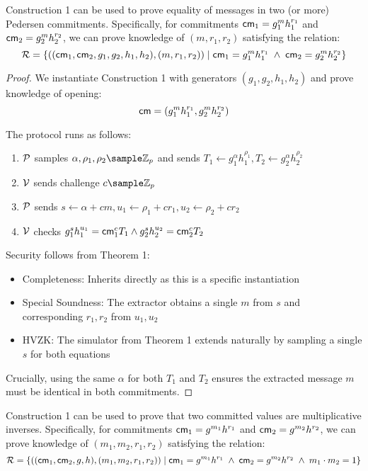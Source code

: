 {\begin{corollary}
    Construction 1 can be used to prove equality of messages in two (or more) Pedersen commitments. Specifically, for commitments $\mathsf{cm}_1 = g_1^m h_1^{r_1}$ and $\mathsf{cm}_2 = g_2^m h_2^{r_2}$, we can prove knowledge of $(m, r_1, r_2)$ satisfying the relation:
    \[
    \mathcal{R} = \left\{ ((\mathsf{cm}_1, \mathsf{cm}_2, g_1, g_2, h_1, h_2), (m,r_1,r_2)) \; | \; \mathsf{cm}_1 = g_1^{m}h_1^{r_1} \; \wedge \; \mathsf{cm}_2 = g_2^{m}h_2^{r_2} \right\}
    \]    
\end{corollary}

\begin{proof}
    We instantiate Construction 1 with generators $(g_1, g_2, h_1, h_2)$ and prove knowledge of opening:
    \[
    \mathsf{cm} = (g_1^m h_1^{r_1}, g_2^m h_2^{r_2})
    \]
    
\noindent    The protocol runs as follows:
    \begin{enumerate}
        \item $\mathcal{P}$ samples $\alpha, \rho_1, \rho_2 \sample \Z_p$ and sends $T_1 \gets g_1^{\alpha}h_1^{\rho_1}, T_2 \gets g_2^{\alpha}h_2^{\rho_2}$
        \item $\mathcal{V}$ sends challenge $c \sample \Z_p$
        \item $\mathcal{P}$ sends $s \gets \alpha + cm, u_1 \gets \rho_1 + cr_1, u_2 \gets \rho_2 + cr_2$
        \item $\mathcal{V}$ checks $g_1^s h_1^{u_1} = \mathsf{cm}_1^c T_1 \wedge g_2^s h_2^{u_2} = \mathsf{cm}_2^c T_2$
    \end{enumerate}

\noindent Security follows from Theorem 1:
    \begin{itemize}
        \item Completeness: Inherits directly as this is a specific instantiation
        \item Special Soundness: The extractor obtains a single $m$ from $s$ and corresponding $r_1, r_2$ from $u_1, u_2$
        \item HVZK: The simulator from Theorem 1 extends naturally by sampling a single $s$ for both equations
    \end{itemize}
    
    Crucially, using the same $\alpha$ for both $T_1$ and $T_2$ ensures the extracted message $m$ must be identical in both commitments.
\end{proof}

\begin{corollary}
    Construction 1 can be used to prove that two committed values are multiplicative inverses. Specifically, for commitments $\mathsf{cm}_1 = g^{m_1}h^{r_1}$ and $\mathsf{cm}_2 = g^{m_2}h^{r_2}$, we can prove knowledge of $(m_1, m_2, r_1, r_2)$ satisfying the relation:
    \[
    \mathcal{R} = \left\{ ((\mathsf{cm}_1, \mathsf{cm}_2, g, h), (m_1, m_2, r_1, r_2)) \; | \; \mathsf{cm}_1 = g^{m_1}h^{r_1} \; \wedge \; \mathsf{cm}_2 = g^{m_2}h^{r_2} \; \wedge \; m_1 \cdot m_2 = 1 \right\}
    \]    
\end{corollary}

}
